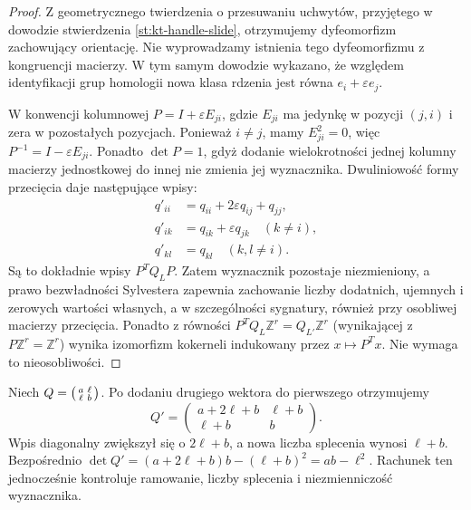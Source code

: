 \begin{proof}
Z geometrycznego twierdzenia o przesuwaniu uchwytów,
przyjętego w dowodzie stwierdzenia
\ref{st:kt-handle-slide}, otrzymujemy dyfeomorfizm
zachowujący orientację. Nie wyprowadzamy istnienia
tego dyfeomorfizmu z kongruencji macierzy.
W tym samym dowodzie wykazano, że względem
identyfikacji grup homologii nowa klasa rdzenia
jest równa $e_i+\varepsilon e_j$.

W konwencji kolumnowej $P=I+\varepsilon E_{ji}$,
gdzie $E_{ji}$ ma jedynkę w pozycji $(j,i)$
i zera w pozostałych pozycjach. Ponieważ $i\ne j$,
mamy $E_{ji}^2=0$, więc
$P^{-1}=I-\varepsilon E_{ji}$.
Ponadto $\det P=1$, gdyż dodanie wielokrotności
jednej kolumny macierzy jednostkowej do innej
nie zmienia jej wyznacznika. Dwuliniowość formy
przecięcia daje następujące wpisy:
\[
\begin{aligned}
q'_{ii}&=q_{ii}+2\varepsilon q_{ij}+q_{jj},\\
q'_{ik}&=q_{ik}+\varepsilon q_{jk}\quad(k\ne i),\\
q'_{kl}&=q_{kl}\quad(k,l\ne i).
\end{aligned}
\]
Są to dokładnie wpisy $P^TQ_LP$.
Zatem wyznacznik pozostaje niezmieniony,
a prawo bezwładności Sylvestera zapewnia
zachowanie liczby dodatnich, ujemnych i zerowych
wartości własnych, a w szczególności sygnatury,
również przy osobliwej macierzy przecięcia.
Ponadto z równości
$P^TQ_L\mathbb Z^r=Q_{L'}\mathbb Z^r$
(wynikającej z $P\mathbb Z^r=\mathbb Z^r$)
wynika izomorfizm kokerneli indukowany przez
$x\mapsto P^Tx$. Nie wymaga to nieosobliwości.
\end{proof}

\begin{przyklad}
Niech $Q=\begin{psmallmatrix}a&\ell\\\ell&b\end{psmallmatrix}$.
Po dodaniu drugiego wektora do pierwszego otrzymujemy
\[
Q'=\begin{pmatrix}a+2\ell+b&\ell+b\\\ell+b&b\end{pmatrix}.
\]
Wpis diagonalny zwiększył się o $2\ell+b$,
a nowa liczba splecenia wynosi $\ell+b$.
Bezpośrednio
$\det Q'=(a+2\ell+b)b-(\ell+b)^2=ab-\ell^2$.
Rachunek ten jednocześnie kontroluje ramowanie,
liczby splecenia i niezmienniczość wyznacznika.
\end{przyklad}

